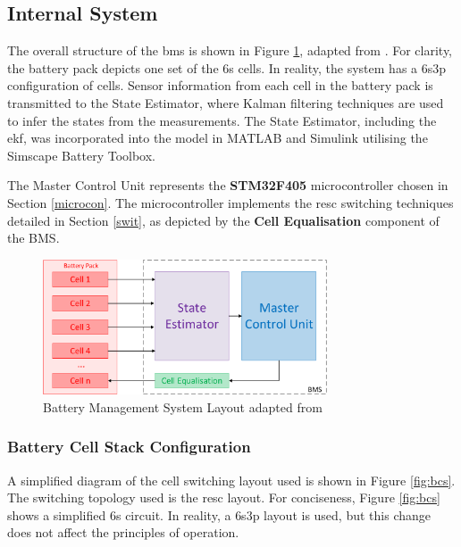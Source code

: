\subsection{Internal System}

The overall structure of the \acrshort{bms} is shown in Figure \ref{fig:bms_layout}, adapted from \cite{7555475}. For clarity, the battery pack depicts one set of the \acrshort{6s} cells. In reality, the system has a \acrshort{6s3p} configuration of cells. Sensor information from each cell in the battery pack is transmitted to the State Estimator, where Kalman filtering techniques are used to infer the states from the measurements. The State Estimator, including the \gls{ekf}, was incorporated into the model in MATLAB and Simulink utilising the Simscape Battery Toolbox.

The Master Control Unit represents the \textbf{STM32F405} microcontroller chosen in Section \ref{microcon}. The microcontroller implements the \gls{resc} switching techniques detailed in Section \ref{swit}, as depicted by the \textbf{Cell Equalisation} component of the BMS.

\begin{figure}[H]
  \centering
  \vspace{5mm}
  \includegraphics[width=0.75\textwidth]{figs/Samuel/Figures/BMS Internal (1)-cropped.pdf}
  \caption[Battery Management System Layout]{Battery Management System Layout adapted from \cite{7555475}}
  \label{fig:bms_layout}
  \vspace{5mm}
\end{figure}






\subsubsection{Battery Cell Stack Configuration}

A simplified diagram of the cell switching layout used is shown in Figure \ref{fig:bcs}. The switching topology used is the \gls{resc} layout. For conciseness, Figure \ref{fig:bcs} shows a simplified \gls{6s} circuit. In reality, a \gls{6s3p} layout is used, but this change does not affect the principles of operation. 


